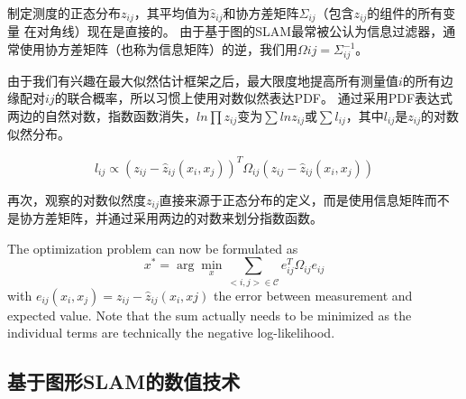 制定测度的正态分布$ z_{ij} $，其平均值为$ \hat {z}_{ij} $和协方差矩阵$ \Sigma_{ij} $（包含$ z_ {ij} $的组件的所有变量 在对角线）现在是直接的。 由于基于图的SLAM最常被公认为信息过滤器，通常使用协方差矩阵（也称为信息矩阵）的逆，我们用$ \Omega {ij} = \Sigma_ {ij} ^ { - 1} $。


由于我们有兴趣在最大似然估计框架之后，最大限度地提高所有测量值$ i$的所有边缘配对$ ij $的联合概率，所以习惯上使用对数似然表达PDF。 通过采用PDF表达式两边的自然对数，指数函数消失，$ln\prod {z_{ij}} $变为$ \sum {ln z_{ij}} $或$ \sum {l_{ij} } $，其中$ l_{ij} $是$ z_{ij} $的对数似然分布。

\begin{equation}
l_{ij} \propto (z_{ij}-\hat{z}_{ij}(x_i,x_j))^T\Omega_{ij}(z_{ij}-\hat{z}_{ij}(x_i,x_j))
\end{equation}


再次，观察的对数似然度$ z_ {ij} $直接来源于正态分布的定义，而是使用信息矩阵而不是协方差矩阵，并通过采用两边的对数来划分指数函数。

The optimization problem can now be formulated as
\begin{equation}
x^* = \arg \min_{x}\sum_{<i,j>\in \mathcal{C}}e_{ij}^T\Omega_{ij}e_{ij}
\end{equation}
with $ e_{ij}(x_i,x_j)=z_{ij}-\hat{z}_{ij}(x_i,xj)$ the error between measurement and expected value. Note that the sum actually needs to be minimized as the individual terms are technically the negative log-likelihood.

\subsection{基于图形SLAM的数值技术}

